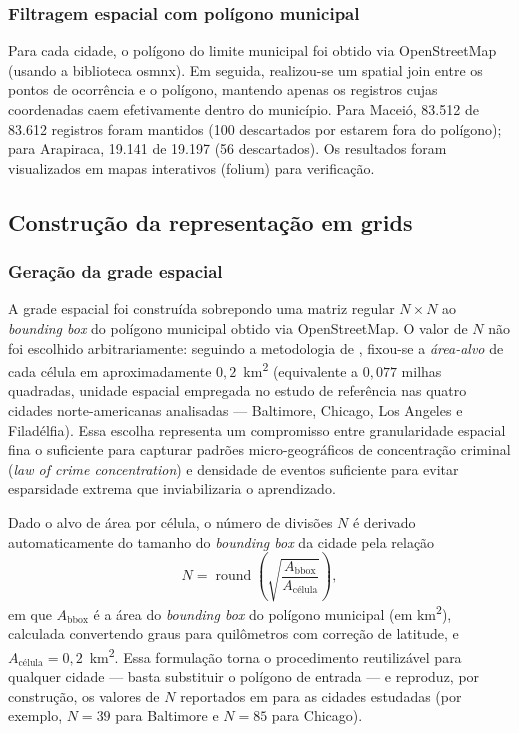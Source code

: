 \subsubsection{Filtragem espacial com polígono municipal}

Para cada cidade, o polígono do limite municipal foi obtido via OpenStreetMap (usando a biblioteca osmnx). Em seguida, realizou-se um spatial join entre os pontos de ocorrência e o polígono, mantendo apenas os registros cujas coordenadas caem efetivamente dentro do município. Para Maceió, 83.512 de 83.612 registros foram mantidos (100 descartados por estarem fora do polígono); para Arapiraca, 19.141 de 19.197 (56 descartados). Os resultados foram visualizados em mapas interativos (folium) para verificação.

\subsection{Construção da representação em grids}
\label{Sec:grids}

\subsubsection{Geração da grade espacial}

A grade espacial foi construída sobrepondo uma matriz regular $N \times N$ ao \textit{bounding box} do polígono municipal obtido via OpenStreetMap. O valor de $N$ não foi escolhido arbitrariamente: seguindo a metodologia de , fixou-se a \emph{área-alvo} de cada célula em aproximadamente $0{,}2$~km\textsuperscript{2} (equivalente a $0{,}077$ milhas quadradas, unidade espacial empregada no estudo de referência nas quatro cidades norte-americanas analisadas --- Baltimore, Chicago, Los Angeles e Filadélfia). Essa escolha representa um compromisso entre granularidade espacial fina o suficiente para capturar padrões micro-geográficos de concentração criminal (\textit{law of crime concentration}) e densidade de eventos suficiente para evitar esparsidade extrema que inviabilizaria o aprendizado.

Dado o alvo de área por célula, o número de divisões $N$ é derivado automaticamente do tamanho do \textit{bounding box} da cidade pela relação
\begin{equation}
N = \operatorname{round}\!\left(\sqrt{\dfrac{A_{\text{bbox}}}{A_{\text{célula}}}}\right),
\label{eq:grid_size}
\end{equation}
\noindent em que $A_{\text{bbox}}$ é a área do \textit{bounding box} do polígono municipal (em km\textsuperscript{2}), calculada convertendo graus para quilômetros com correção de latitude, e $A_{\text{célula}} = 0{,}2$~km\textsuperscript{2}. Essa formulação torna o procedimento reutilizável para qualquer cidade --- basta substituir o polígono de entrada --- e reproduz, por construção, os valores de $N$ reportados em  para as cidades estudadas (por exemplo, $N = 39$ para Baltimore e $N = 85$ para Chicago).

